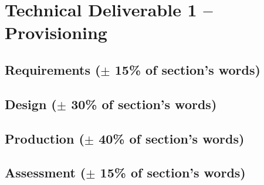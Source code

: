 \section{Technical Deliverable 1 -- Provisioning}
% 
\subsection{Requirements ($\pm$ 15\% of section's words)}

\subsection{Design ($\pm$ 30\% of section's words)}

\subsection{Production ($\pm$ 40\% of section's words)}

\subsection{Assessment ($\pm$ 15\% of section's words)}

